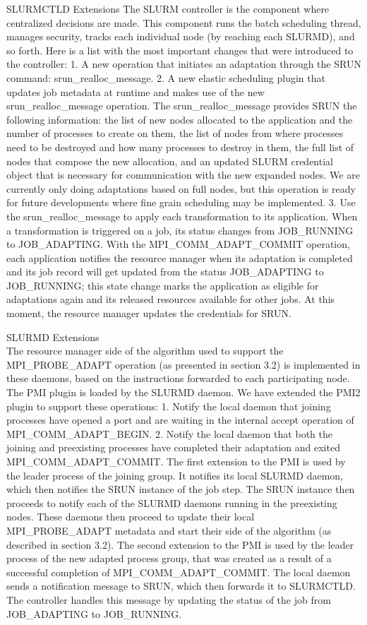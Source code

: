 SLURMCTLD Extensions
The SLURM controller is the component where centralized decisions are made. This component runs the batch scheduling thread, manages security, tracks each individual node (by reaching each SLURMD), and so forth. Here is a list with the most important changes that were introduced to the controller: 
1. A new operation that initiates an adaptation through the SRUN command: srun{\_}realloc{\_}message.
2. A new elastic scheduling plugin that updates job metadata at runtime and makes use of the new srun{\_}realloc{\_}message operation.
The srun{\_}realloc{\_}message provides SRUN the following information: the list of new nodes allocated to the application and the number of processes to create on them, the list of nodes from where processes need to be destroyed and how many processes to destroy in them, the full list of nodes that compose the new allocation, and an updated SLURM credential object that is necessary for communication with the new expanded nodes. We are currently only doing adaptations based on full nodes, but this operation is ready for future developments where fine grain scheduling may be implemented.
3. Use the srun{\_}realloc{\_}message to apply each transformation to its application. When a transformation is triggered on a job, its status
changes from JOB{\_}RUNNING to JOB{\_}ADAPTING. With the MPI{\_}COMM{\_}ADAPT{\_}COMMIT operation, each application notifies the resource manager when its adaptation is completed and its job record will get updated from the status JOB{\_}ADAPTING to JOB{\_}RUNNING; this state change marks the application as eligible for adaptations again and its released resources available for other jobs. At this moment, the resource manager
 updates the credentials for SRUN.

SLURMD Extensions\\
The resource manager side of the algorithm used to support the MPI{\_}PROBE{\_}ADAPT operation (as presented in section 3.2) is implemented in these daemons, based on the instructions forwarded to each participating node. The PMI plugin is loaded by the SLURMD daemon. We have extended the PMI2 plugin to support these operations:
1. Notify the local daemon that joining processes have opened a port and are waiting in the internal accept operation of MPI{\_}COMM{\_}ADAPT{\_}BEGIN.
2. Notify the local daemon that both the joining and preexisting processes have completed their adaptation and exited MPI{\_}COMM{\_}ADAPT{\_}COMMIT.
The first extension to the PMI is used by the leader process of the joining group. It notifies its local SLURMD daemon, which then notifies the SRUN instance of the job step. The SRUN instance then proceeds to notify each of the SLURMD daemons running in the preexisting nodes. These daemons then proceed to update their local MPI{\_}PROBE{\_}ADAPT metadata and start their side of the algorithm (as described in section 3.2).
The second extension to the PMI is used by the leader process of the new adapted process group, that was created as a result of a successful completion of MPI{\_}COMM{\_}ADAPT{\_}COMMIT. The local daemon sends a notification message to SRUN, which then forwards it to SLURMCTLD. The controller handles this message by updating the status of the job from JOB{\_}ADAPTING to JOB{\_}RUNNING.

